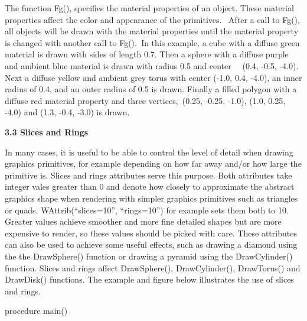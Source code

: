 \documentclass[letterpaper]{article}
\begin{document}
{
The function \textsf{Fg()}, specifies the material properties of an object. These material properties affect the color
and appearance of the primitives. \ After a call to \textsf{Fg()}, all objects will be drawn with the material
properties until the material property is changed with another call to \textsf{Fg()}.\texttt{ }In this example, a cube
with a diffuse green material is drawn with sides of length 0.7. Then a sphere with a diffuse purple and ambient blue
material is drawn with radius 0.5 and center \ \ \textsf{(0.4, -0.5, -4.0)}. Next a diffuse yellow and ambient grey
torus with center \textsf{(-1.0, 0.4, -4.0)}, an inner radius of 0.4, and an outer radius of 0.5 is drawn. Finally a
filled polygon with a diffuse red material property and three vertices,\texttt{ }\textsf{(0.25, -0.25, -1.0)},
\textsf{(1.0, 0.25, -4.0)} and \textsf{(1.3, -0.4, -3.0)} is drawn.}


\bigskip

{\bfseries
3.3 Slices and Rings}

{
In many cases, it is useful to be able to control the level of detail when drawing graphics primitives, for example
depending on how far away and/or how large the primitive is. Slices and rings attributes serve this purpose. Both
attributes take integer vales greater than 0 and denote how closely to approximate the abstract graphics shape when
rendering with simpler graphics primitives such as triangles or quads. \textsf{WAttrib(``slices=10'', ``rings=10'')}
for example sets them both to 10. Greater values achieve smoother and more fine detailed shapes but are more expensive
to render, so these values should be picked with care. These attributes can also be used to achieve some useful
effects, such as drawing a diamond using the the Draw\foreignlanguage{english}{Sphere()} function or drawing a pyramid
using the \textsf{Draw}\foreignlanguage{english}{\textsf{Cylinder()}} function.
\foreignlanguage{english}{\textsf{Slices}} and \foreignlanguage{english}{\textsf{rings}} affect
\textsf{Draw}\foreignlanguage{english}{\textsf{Sphere()}}, \textsf{Draw}\foreignlanguage{english}{\textsf{Cylinder()}},
\textsf{Draw}\foreignlanguage{english}{\textsf{Torus()}} and \textsf{Draw}\foreignlanguage{english}{\textsf{Disk()}}
functions. The example and figure below illustrates the use of \foreignlanguage{english}{\textsf{slices}} and
\foreignlanguage{english}{\textsf{rings}}.}

{\sffamily
procedure main()}
\end{document}
